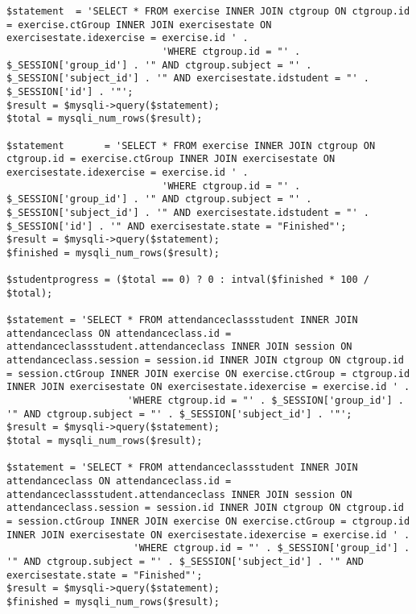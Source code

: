 \noindent
\begin{lstlisting}[caption=Obtener información para la carga de la barra de progreso del estudiante.,label={lst:progress-bar-info-student}]
$statement  = 'SELECT * FROM exercise INNER JOIN ctgroup ON ctgroup.id = exercise.ctGroup INNER JOIN exercisestate ON exercisestate.idexercise = exercise.id ' .
                           'WHERE ctgroup.id = "' . $_SESSION['group_id'] . '" AND ctgroup.subject = "' . $_SESSION['subject_id'] . '" AND exercisestate.idstudent = "' . $_SESSION['id'] . '"';	
$result = $mysqli->query($statement);
$total = mysqli_num_rows($result);

$statement       = 'SELECT * FROM exercise INNER JOIN ctgroup ON ctgroup.id = exercise.ctGroup INNER JOIN exercisestate ON exercisestate.idexercise = exercise.id ' .
                           'WHERE ctgroup.id = "' . $_SESSION['group_id'] . '" AND ctgroup.subject = "' . $_SESSION['subject_id'] . '" AND exercisestate.idstudent = "' . $_SESSION['id'] . '" AND exercisestate.state = "Finished"';
$result = $mysqli->query($statement);
$finished = mysqli_num_rows($result);

$studentprogress = ($total == 0) ? 0 : intval($finished * 100 / $total);

$statement = 'SELECT * FROM attendanceclassstudent INNER JOIN attendanceclass ON attendanceclass.id = attendanceclassstudent.attendanceclass INNER JOIN session ON attendanceclass.session = session.id INNER JOIN ctgroup ON ctgroup.id = session.ctGroup INNER JOIN exercise ON exercise.ctGroup = ctgroup.id INNER JOIN exercisestate ON exercisestate.idexercise = exercise.id ' .
                     'WHERE ctgroup.id = "' . $_SESSION['group_id'] . '" AND ctgroup.subject = "' . $_SESSION['subject_id'] . '"';
$result = $mysqli->query($statement);
$total = mysqli_num_rows($result);

$statement = 'SELECT * FROM attendanceclassstudent INNER JOIN attendanceclass ON attendanceclass.id = attendanceclassstudent.attendanceclass INNER JOIN session ON attendanceclass.session = session.id INNER JOIN ctgroup ON ctgroup.id = session.ctGroup INNER JOIN exercise ON exercise.ctGroup = ctgroup.id INNER JOIN exercisestate ON exercisestate.idexercise = exercise.id ' .
                      'WHERE ctgroup.id = "' . $_SESSION['group_id'] . '" AND ctgroup.subject = "' . $_SESSION['subject_id'] . '" AND exercisestate.state = "Finished"';
$result = $mysqli->query($statement);
$finished = mysqli_num_rows($result);
\end{lstlisting}

